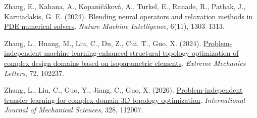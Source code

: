 \documentclass[preprint,12pt,authoryear]{elsarticle}
\begin{document}
Zhang, E., Kahana, A., Kopaničáková, A., Turkel, E., Ranade, R., Pathak, J., Karniadakis, G. E. (2024). \href{https://doi.org/10.1038/s42256-024-00910-x}{Blending neural operators and relaxation methods in PDE numerical solvers}. \emph{Nature Machine Intelligence}, 6(11), 1303--1313.

Zhang, L., Huang, M., Liu, C., Du, Z., Cui, T., Guo, X. (2024). \href{https://doi.org/10.1016/j.eml.2024.102237}{Problem-independent machine learning-enhanced structural topology optimization of complex design domains based on isoparametric elements}. \emph{Extreme Mechanics Letters}, 72, 102237.

Zhang, L., Liu, C., Guo, Y., Jiang, C., Guo, X. (2026). \href{https://doi.org/10.1016/j.ijmecsci.2026.112007}{Problem-independent transfer learning for complex-domain 3D topology optimization}. \emph{International Journal of Mechanical Sciences}, 328, 112007.

\endgroup
\end{document}
